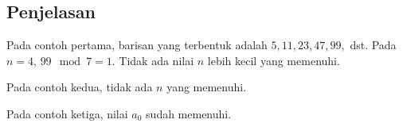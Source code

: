 \documentclass{article}
\begin{document}
\subsection*{Penjelasan}

\par\noindent Pada contoh pertama, barisan yang terbentuk adalah $5, 11, 23, 47, 99,$ dst. Pada $n = 4$, $99 \mod 7 = 1$. Tidak ada nilai $n$ lebih kecil yang memenuhi.

\par\noindent Pada contoh kedua, tidak ada $n$ yang memenuhi.

\par\noindent Pada contoh ketiga, nilai $a_0$ sudah memenuhi.
\end{document}
